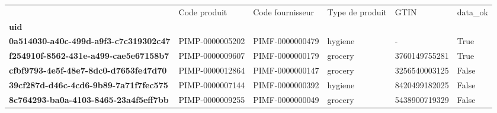 \begin{tabularx}{\linewidth}{lXXXXX}
\toprule
{} &     Code produit & Code fournisseur & Type de produit &           GTIN &  data\_ok \\
\textbf{uid                                 } &                  &                  &                 &                &          \\
\midrule
\textbf{0a514030-a40c-499d-a9f3-c7c319302c47} &  PIMP-0000005202 &  PIMF-0000000479 &         hygiene &              - &     True \\
\textbf{f254910f-8562-431e-a499-cae5e67158b7} &  PIMP-0000009607 &  PIMF-0000000179 &         grocery &  3760149755281 &     True \\
\textbf{cfbf9793-4e5f-48e7-8dc0-d7653fe47d70} &  PIMP-0000012864 &  PIMF-0000000147 &         grocery &  3256540003125 &    False \\
\textbf{39cf287d-d46c-4cd6-9b89-7a71f7fec575} &  PIMP-0000007144 &  PIMF-0000000392 &         hygiene &  8420499182025 &    False \\
\textbf{8c764293-ba0a-4103-8465-23a4f5eff7bb} &  PIMP-0000009255 &  PIMF-0000000049 &         grocery &  5438900719329 &    False \\
\bottomrule
\end{tabularx}
